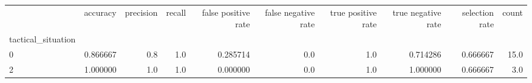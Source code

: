 \begin{tabular}{lrrrrrrrrr}
\toprule
{} &  accuracy &  precision &  recall &  false positive rate &  false negative rate &  true positive rate &  true negative rate &  selection rate &  count \\
tactical\_situation &           &            &         &                      &                      &                     &                     &                 &        \\
\midrule
0                  &  0.866667 &        0.8 &     1.0 &             0.285714 &                  0.0 &                 1.0 &            0.714286 &        0.666667 &   15.0 \\
2                  &  1.000000 &        1.0 &     1.0 &             0.000000 &                  0.0 &                 1.0 &            1.000000 &        0.666667 &    3.0 \\
\bottomrule
\end{tabular}
